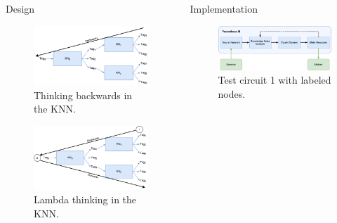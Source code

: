 \documentclass[final]{beamer} %
\begin{document}
\begin{columns}
\begin{column}{.3\textwidth}
\begin{block}{Design}
			\begin{figure}[!htb]
				\includegraphics[width=0.5\columnwidth]{figures/backwards_thinking.pdf}
				\caption{Thinking backwards in the KNN.}
				\label{think_backwards}
			\end{figure}
		
			\begin{figure}[!htb]
				\includegraphics[width=0.5\columnwidth]{figures/lambda_thinking.pdf}
				\caption{Lambda thinking in the KNN.}
				\label{think_lambda}
			\end{figure}
		\end{block}
	\end{column}
	\begin{column}{.3\textwidth}
	\begin{block}{Implementation}
		\begin{figure}[!htb]
			\centering
			\includegraphics[width=0.5\columnwidth]{figures/ai_model.pdf}
			\caption
			{Test circuit 1 with labeled nodes.}
		\end{figure}
	\end{block}
	\end{column}
\end{columns}
\end{document}
